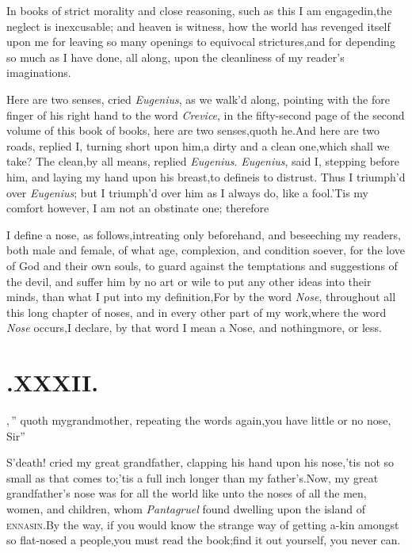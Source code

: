 \documentclass{article}
\begin{document}
In books of strict morality and close reasoning, such as this I am
engaged\break in,\tsk the neglect is inexcusable; and hea\-ven is witness,
how the world has re\-venged itself upon me for leaving so many
openings to equivocal strictures,\tsk and for depending so much as
I have done, all along, upon the cleanliness of my reader’s
imaginations.

\tsh Here are two senses, cried \textit{Eu\-genius}, as we walk’d
along, pointing with the fore finger of his right hand to the
word \textit{Crevice}, in the fifty-second page of the second
volume of this book of books,
\tsh here are two senses,\tsk quoth he.\tsk And here are two
roads, replied I, turning short upon him,\tsh a dirty and a
clean one,\tsh which shall we take?\tsk\break
The clean,\tsk by all means, replied \textit{Eu\-genius}.  \textit{Eugenius},
said I, stepping before him, and laying my hand upon his\break
breast,\tsh to define\tsh is to distrust.\tsh\break
Thus I triumph’d over \textit{Eugenius}; but I triumph’d over
him as I always do, like a fool.\tsh ’Tis my comfort however, I
am not an obstinate one; therefore

I define a nose, as follows,\tsh intreat\-ing only beforehand, and
beseeching my readers, both male and female, of what age,
complexion, and condition soever, for the love of God and their own
souls, to guard against the temptations and suggestions of the
devil, and suffer him by no art or wile to put any other
ideas
into their minds, than what I put into my definition,\tsk For by
the word \textit{Nose}, throughout all this long chapter of
noses, and in every other part of my work,\break where the word
\textit{Nose} occurs,\tsk I declare, by that word I mean a Nose,
and nothing\break more, or less.

\null
\section{.\quad  XXXII.}

,\,”
quoth my\break grandmother, repeating the\break
words again,\tsk\lqq you have little or no\break
\lqq nose, Sir”\tsh

S’death! cried my great grandfather, clapping his hand
upon his nose,\tsk ’tis not so small as that comes
to;\tsk ’tis a full inch longer than my
father’s.\tsk Now, my great grandfather’s nose was
for all
the world like unto the noses of all the men, women, and
children, whom \textit{Pantagruel} found dwelling upon the
island of \textsc{ennasin}.\tsh By the way, if you would know
the strange way of getting a-kin amongst so flat-nosed a
people,\tsk you must read the book;\tsk find it out yourself,
you never can.\tsh
\end{document}
